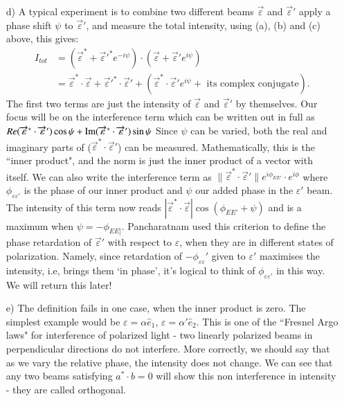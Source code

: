 \begin{itemize}
\item[d)] A typical experiment is to combine two different beams $\overrightarrow{\varepsilon}$ and $\overrightarrow{\varepsilon}'$ apply a phase
shift $\psi$ to $\overrightarrow{\varepsilon}'$, and measure the total intensity, using (a), (b) and (c) above, this
gives:
\begin{align*}
I_{tot} & = (\overrightarrow{\varepsilon}^{\ast} + \overrightarrow{\varepsilon}'^{\ast} e^{-i\psi})  \cdot (\overrightarrow{\varepsilon} + \overrightarrow{\varepsilon}' e^{i\psi})\\
& = \overrightarrow{\varepsilon}^{\ast} \cdot \overrightarrow{\varepsilon} + \overrightarrow{\varepsilon}'^{\ast}  \cdot \overrightarrow{\varepsilon}' + (\overrightarrow{\varepsilon}^{\ast} \cdot \overrightarrow{\varepsilon}' e^{i\psi}  + \text{ its complex conjugate}).
\end{align*}
The first two terms are just the intensity of $\overrightarrow{\varepsilon}$ and $\overrightarrow{\varepsilon}'$ by themselves. Our focus will be on the interference term which can be written out in full as $Re(\overrightarrow{\varepsilon}^{\ast}  \cdot \overrightarrow{\varepsilon}') \cos \psi + \operatorname{\mathrm{Im}} (\overrightarrow{\varepsilon}^{\ast} \cdot \overrightarrow{\varepsilon}') \sin \psi$
Since $\psi$ can be varied, both the real and imaginary parts of ($\overrightarrow{\varepsilon}^{\ast} \cdot \overrightarrow{\varepsilon}'$) can be
measured. Mathematically, this is the ``inner product", and the norm is just
the inner product of a vector with itself. We can also write the interference
term as $\| \overrightarrow{\varepsilon}^{\ast}  \cdot \overrightarrow{\varepsilon}'\| e^{i\phi_{EE'}} \cdot e^{i\phi}$ where $\phi_{\varepsilon \varepsilon'}$ is the phase of our inner product and $\psi$ our added phase in the $\varepsilon'$ beam. The intensity of this term now reads
$| \overrightarrow{\varepsilon}^{\ast} \cdot \overrightarrow{\varepsilon}| \cos (\phi_{EE'} + \psi)$ and is a maximum when $\psi = -\phi_{EE]}$. Pancharatnam
used this criterion to define the phase retardation of $\overrightarrow{\varepsilon}'$ with respect to $\varepsilon$, when
they are in different states of polarization. Namely, since retardation of $-\phi_{\varepsilon \varepsilon}'$ 
given to $\varepsilon'$ maximises the intensity, i.e, brings them `in phase', it's logical to
think of $\phi_{\varepsilon \varepsilon'}$ in this way. We will return this later!

\item[e)] The definition fails in one case, when the inner product is zero. The simplest
example would be $\varepsilon = \alpha \hat{e}_1$, $\varepsilon = \alpha' \hat{e}_2$. This is one of the ``Fresnel Argo laws" for
interference of polarized light - two linearly polarized beams in perpendicular
directions do not interfere. More correctly, we should say that as we vary the
relative phase, the intensity does not change. We can see that any two beams
satisfying $a^{\ast} \cdot b = 0$ will show this non interference in intensity - they are called
orthogonal.


\end{itemize}
